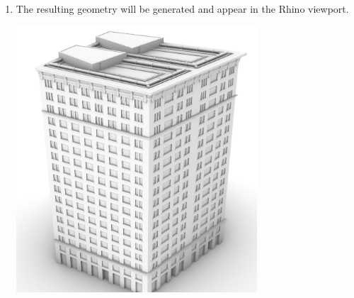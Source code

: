 \begin{enumerate}
\begin{minipage}{\linewidth}
    \end{minipage}
    \item The resulting geometry will be generated and appear in the Rhino viewport.\\
    \begin{minipage}{\linewidth}
        \centering
        \includegraphics[width=9cm]{res/man_rhino_cmd_result}
    \end{minipage}
\end{enumerate}

